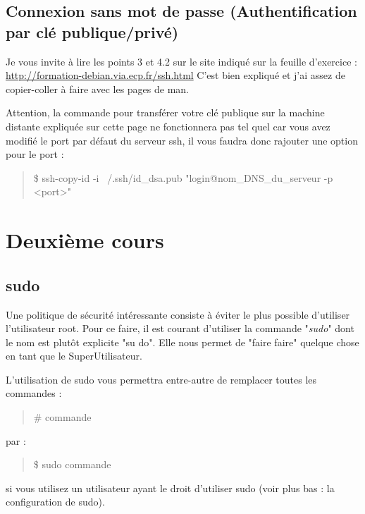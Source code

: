 \documentclass[a4paper,11pt]{article}
\newcommand{\commande}[1] {
    \begin{quote}
    \tt\raggedright #1 
    \end{quote}
}
\begin{document}
\subsection{Connexion sans mot de passe (Authentification par clé publique/privé)}
\par Je vous invite à lire les points 3 et 4.2 sur le site indiqué sur la feuille d'exercice : \\
\url{http://formation-debian.via.ecp.fr/ssh.html} C'est bien expliqué et j'ai assez de copier-coller à faire avec les pages de man.
\par Attention, la commande pour transférer votre clé publique sur la machine distante expliquée sur cette page ne fonctionnera pas tel quel car vous avez modifié le port par défaut du serveur ssh, il vous faudra donc rajouter une option pour le port :
\commande{\$ ssh-copy-id -i ~/.ssh/id\_dsa.pub "login@nom\_DNS\_du\_serveur -p <port>"}

\section{Deuxième cours}
\subsection{sudo}
\par Une politique de sécurité intéressante consiste à éviter le plus possible d'utiliser l'utilisateur root. Pour ce faire, il est courant d'utiliser la commande "\emph{sudo}" dont le nom est plutôt explicite "su do". Elle nous permet de "faire faire" quelque chose en tant que le SuperUtilisateur.
\par L'utilisation de sudo vous permettra entre-autre de remplacer toutes les commandes :
\commande{\# commande}
par :
\commande{\$ sudo commande}
si vous utilisez un utilisateur ayant le droit d'utiliser sudo (voir plus bas : la configuration de sudo).
\end{document}
